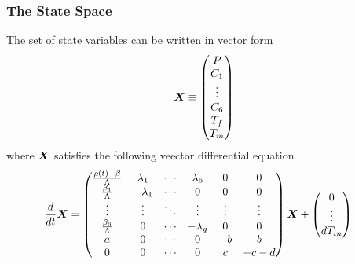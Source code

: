 \documentclass[10pt,compress]{beamer}
\begin{document}
\begin{frame}\frametitle{The State Space}
    The set of state variables can be written in vector form
    \begin{equation}
        \begin{split}
            \boldsymbol{X}\equiv \begin{pmatrix}
                P\\
                C_1\\
                \vdots\\
                C_6\\
                T_f\\
                T_m
            \end{pmatrix}\nonumber
        \end{split}
    \end{equation}
    where $\boldsymbol{X}$ satisfies the following veector differential equation
    \begin{equation}
        \begin{split}
            \frac{d}{dt}\boldsymbol{X}&= \begin{pmatrix}
                \frac{\rho(t) - \beta}{\Lambda} & \lambda_1 & \cdots & \lambda_6 & 0 & 0\\
                \frac{\beta_1}{\Lambda} & -\lambda_1 & \cdots & 0 & 0 & 0\\
                \vdots & \vdots & \ddots & \vdots & \vdots & \vdots\\
                \frac{\beta_6}{\Lambda} & 0 & \cdots & -\lambda_g & 0 & 0\\
                a & 0 & \cdots & 0 & - b & b\\
                 0 & 0 & \cdots & 0 & c & -c -d
            \end{pmatrix}\boldsymbol{X} + \begin{pmatrix}
                0\\
                \vdots\\
                d T_{in}
            \end{pmatrix}\nonumber
        \end{split}
    \end{equation}
\end{frame}
\end{document}
